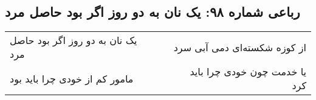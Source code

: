 \begin{center}
\section*{رباعی شماره ۹۸: یک نان به دو روز اگر بود حاصل مرد}
\label{sec:sh098}
\begin{longtable}{l p{0.5cm} r}
یک نان به دو روز اگر بود حاصل مرد
&&
از کوزه شکسته‌ای دمی آبی سرد
\\
مامور کم از خودی چرا باید بود
&&
یا خدمت چون خودی چرا باید کرد
\\
\end{longtable}
\end{center}

